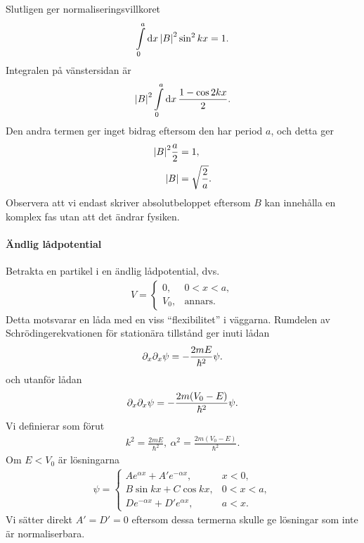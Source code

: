 Slutligen ger normaliseringsvillkoret
\begin{align*}
	\int\limits_{0}^{a}\dd{x}\abs{B}^{2}\sin^{2}{kx} = 1.
\end{align*}
Integralen på vänstersidan är
\begin{align*}
	\abs{B}^{2}\int\limits_{0}^{a}\dd{x}\frac{1 - \cos{2kx}}{2}.
\end{align*}
Den andra termen ger inget bidrag eftersom den har period $a$, och detta ger
\begin{align*}
	\abs{B}^{2}\frac{a}{2} &= 1, \\
	\abs{B}                &= \sqrt{\frac{2}{a}}.
\end{align*}
Observera att vi endast skriver absolutbeloppet eftersom $B$ kan innehålla en komplex fas utan att det ändrar fysiken.

\paragraph{Ändlig lådpotential}
Betrakta en partikel i en ändlig lådpotential, dvs.
\begin{align*}
	V = 
	\begin{cases}
		0,      &0 < x < a, \\
		V_{0},  &\text{annars.}
	\end{cases}
\end{align*}
Detta motsvarar en låda med en viss ``flexibilitet'' i väggarna. Rumdelen av Schrödingerekvationen för stationära tillstånd ger inuti lådan
\begin{align*}
	\partial_{x}\partial_{x}\psi = -\frac{2mE}{\hbar^{2}}\psi.
\end{align*}
och utanför lådan
\begin{align*}
	\partial_{x}\partial_{x}\psi = -\frac{2m(V_{0} - E)}{\hbar^{2}}\psi.
\end{align*}
Vi definierar som förut
\begin{align*}
	k^{2} = \frac{2mE}{\hbar^{2}},\ \alpha^{2} = \frac{2m(V_{0} - E)}{\hbar^{2}}.
\end{align*}
Om $E < V_{0}$ är lösningarna
\begin{align*}
	\psi =
	\begin{cases}
		Ae^{\alpha x} + A'e^{-\alpha x}, &x < 0, \\
		B\sin{kx} + C\cos{kx},           &0 < x < a, \\
		De^{-\alpha x} + D'e^{\alpha x}, &a < x.
	\end{cases}
\end{align*}
Vi sätter direkt $A' = D' = 0$ eftersom dessa termerna skulle ge lösningar som inte är normaliserbara.

